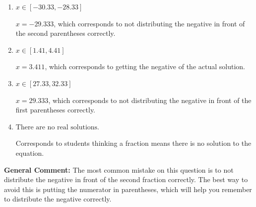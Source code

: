 \documentclass{extbook}[14pt]
\begin{document}
\begin{enumerate}
{\begin{enumerate}[label=\Alph*.]
* $x = -11.200$, which is the correct option.
\item \( x \in [-30.33, -28.33] \)

$x = -29.333$, which corresponds to not distributing the negative in front of the second parentheses correctly.
\item \( x \in [1.41, 4.41] \)

$x = 3.411$, which corresponds to getting the negative of the actual solution.
\item \( x \in [27.33, 32.33] \)

$x = 29.333$, which corresponds to not distributing the negative in front of the first parentheses correctly.
\item \( \text{There are no real solutions.} \)

Corresponds to students thinking a fraction means there is no solution to the equation.
\end{enumerate}

\textbf{General Comment:} The most common mistake on this question is to not distribute the negative in front of the second fraction correctly. The best way to avoid this is putting the numerator in parentheses, which will help you remember to distribute the negative correctly.
}
\end{enumerate}
\end{document}
